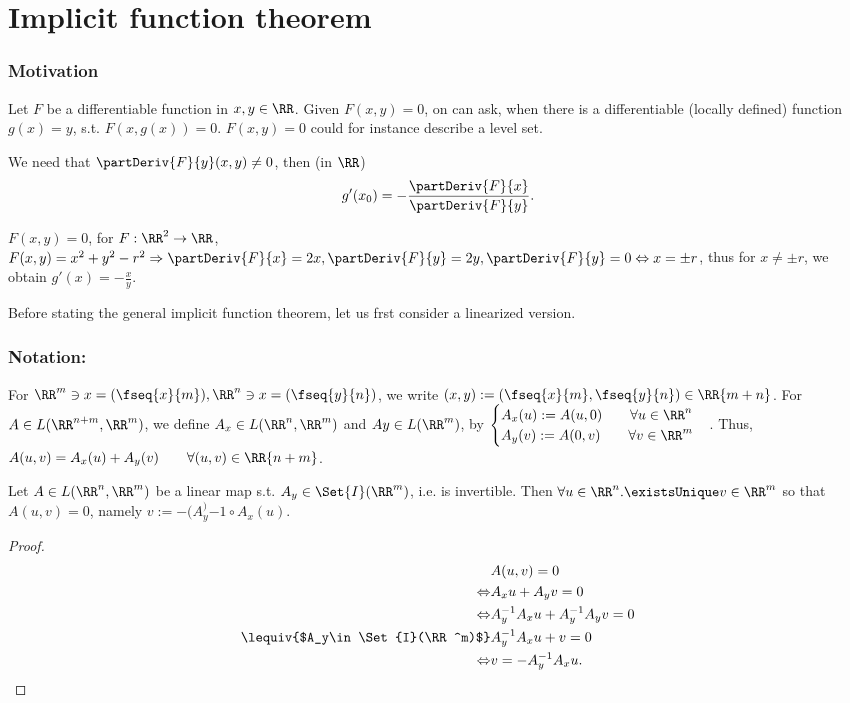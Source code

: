 \section{Implicit function theorem}
\subsubsection*{Motivation}
Let $F$ be a differentiable function in $x, y\in\RR$. Given $F(x,y)=0$, on can ask, when there is a differentiable (locally defined) function $g(x)=y$, s.t. $F(x,g(x))=0$. $F(x,y)=0$ could for instance describe a level set. 

We need that $\partDeriv{F}{y}(x,y)\neq 0$, then (in $\RR$) $$g'(x_0)=-\frac{\partDeriv{F}{x}}{\partDeriv{F}{y}}.$$
\begin{exam}
  $F(x,y)=0$, for $F:\RR^2\to\RR$, $F(x,y)=x^2+y^2-r^2\Rightarrow \partDeriv{F}{x}=2x, \partDeriv{F}{y}=2y, \partDeriv{F}{y}=0\Leftrightarrow x=\pm r$, thus for $x\neq \pm r$, we obtain $g'(x)=-\frac{x}{y}$.
\end{exam}
Before stating the general implicit function theorem, let us frst consider a linearized version. 
\subsubsection*{Notation:}
For $\RR^m\ni x=(\fseq{x}{m}), \RR^n\ni x=(\fseq{y}{n})$, we write $(x,y):=(\fseq{x}{m},\fseq{y}{n})\in\RR{m+n}$. For $A\in L(\RR^{n+m},\RR^m)$, we define $A_x\in L(\RR^n, \RR^m)$ and $Ay\in L(\RR^m)$, by $\begin{cases}A_x(u):=A(u,0)\qquad\forall u\in\RR^n\\A_y(v):=A(0,v)\qquad\forall v\in\RR^m\end{cases}$. Thus, $A(u,v)=A_x(u)+A_y(v)\qquad\forall(u,v)\in\RR{n+m}$.

\begin{thm}
  Let $A\in L(\RR^n, \RR^m)$ be a linear map s.t. $A_y\in \Set{I}(\RR^m)$, i.e. is invertible. Then $\forall u\in\RR^n.\existsUnique v\in\RR^m$ so that $A(u,v)=0$, namely $v:=-(A_y^){-1}\circ A_x(u)$. 
\end{thm}
\begin{proof}
  \begin{align*}
  	&A(u,v)=0\\\Leftrightarrow &A_x u+A_y v=0\\\Leftrightarrow &A_y^{-1}A_xu+A_y^{-1}A_y v=0\\\lequiv{$A_y\in \Set{I}(\RR^m)$}&A_y^{-1}A_xu+v=0\\\Leftrightarrow &v=-A_y^{-1}A_x u.
  \end{align*}
\end{proof}

